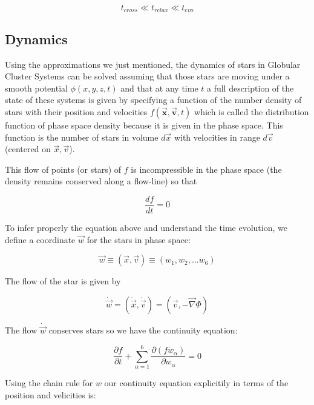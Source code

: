\begin{equation}
t_{cross}\ll t_{relax}\ll t_{evo}
\end{equation}

\subsection{Dynamics}

Using the approximations we just mentioned, the dynamics of stars in Globular Cluster Systems can be solved assuming that those stars are moving under a smooth potential $\phi (x,y,z,t)$ and that at any time $t$ a full description of the state of these systems is given by specifying a function of the number density of stars with their position and velocities $f(\vec{\textbf{x}},\vec{\textbf{v}},t)$ which is called the distribution function of phase space density because it is given in the phase space. This function is the number of stars in volume $d\vec{x}$ with velocities in range $d\vec{v}$ (centered on $\vec{x},\vec{v}$).

This flow of points (or stars) of $f$ is incompressible in the phase space (the density remains conserved along a flow-line) so that

\begin{equation}
\frac{df}{dt}=0
\end{equation}

To infer properly the equation above and understand the time evolution, we define a coordinate $\vec{w}$ for the stars in phase space:

\begin{equation}
\vec{w}\equiv (\vec{x},\vec{v})\equiv (w_{1},w_{2},...w_{6})
\end{equation}

The flow of the star is given by 

\begin{equation}
\dot{\vec{w}}= (\dot{\vec{x}},\dot{\vec{v}})=(\vec{v},-\vec{\nabla} \Phi)
\end{equation}

The flow $\dot{\vec{w}}$ conserves stars so we have the continuity equation:

\begin{equation}
\frac{\partial f}{\partial t}+\sum_{\alpha=1}^{6}\frac{\partial (f\dot{w}_{\alpha})}{\partial w_{\alpha}}=0
\end{equation}

Using the chain rule for $w$ our continuity equation explicitily in terms of the position and velicities is:

